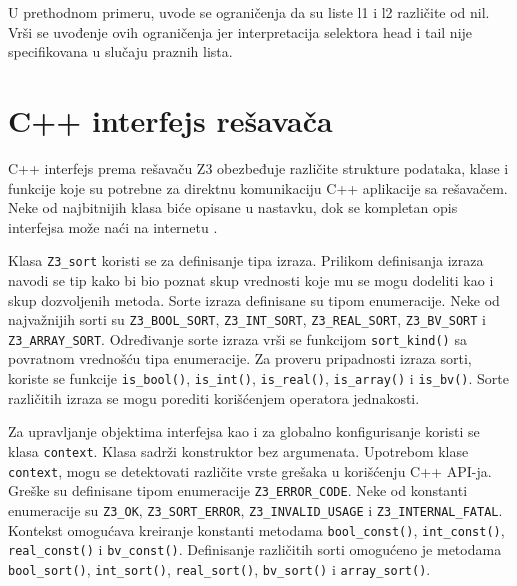 \documentclass[12pt,oneside]{memoir}
\begin{document}
U prethodnom primeru, uvode se ograničenja da su liste l1 i l2 različite od nil. Vrši se uvođenje ovih ograničenja jer interpretacija selektora head i tail 
nije specifikovana u slučaju praznih lista.


\section{C++ interfejs rešavača}  \label{sec:num4}
C++ interfejs prema rešavaču Z3 obezbeđuje različite strukture podataka, klase i funkcije koje su potrebne za direktnu komunikaciju C++ aplikacije sa rešavačem. Neke od najbitnijih klasa biće opisane u nastavku, dok se kompletan opis interfejsa može naći na internetu \cite{cppapi}.

Klasa \texttt{Z3\_sort} koristi se za definisanje tipa izraza.  Prilikom definisanja izraza navodi se tip kako bi bio poznat skup vrednosti koje mu se mogu dodeliti kao i skup dozvoljenih metoda. Sorte izraza definisane su tipom enumeracije. Neke od najvažnijih sorti su \texttt{Z3\_BOOL\_SORT}, \texttt{Z3\_INT\_SORT}, \texttt{Z3\_REAL\_SORT}, \texttt{Z3\_BV\_SORT} i \texttt{Z3\_ARRAY\_SORT}. Određivanje sorte izraza vrši se funkcijom \texttt{sort\_kind()} sa povratnom vrednošću tipa enumeracije. Za proveru pripadnosti izraza sorti, koriste se funkcije \texttt{is\_bool()}, \texttt{is\_int()}, \texttt{is\_real()}, \texttt{is\_array()} i \texttt{is\_bv()}. Sorte različitih izraza se mogu porediti korišćenjem operatora jednakosti. \par 

Za upravljanje objektima interfejsa kao i za globalno konfigurisanje koristi se klasa \texttt{context}. Klasa sadrži konstruktor bez argumenata. Upotrebom klase \texttt{context}, mogu se detektovati različite vrste grešaka u korišćenju C++ API-ja. Greške su definisane tipom enumeracije \texttt{Z3\_ERROR\_CODE}. Neke od konstanti enumeracije su \texttt{Z3\_OK}, \texttt{Z3\_SORT\_ERROR}, \texttt{Z3\_INVALID\_USAGE} i \texttt{Z3\_INTERNAL\_FATAL}.  Kontekst omogućava kreiranje konstanti metodama \texttt{bool\_const()}, \texttt{int\_const()}, \texttt{real\_const()} i \texttt{bv\_const()}. Definisanje različitih sorti omogućeno je metodama \texttt{bool\_sort()}, \texttt{int\_sort()}, \texttt{real\_sort()}, \texttt{bv\_sort()} i \texttt{array\_sort()}. 
\par
\end{document}
